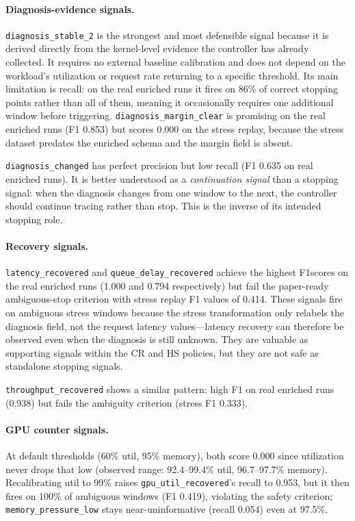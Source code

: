 \paragraph{Diagnosis-evidence signals.}
\texttt{diagnosis\_stable\_2} is the strongest and most defensible signal because it is derived directly from the kernel-level evidence the controller has already collected. It requires no external baseline calibration and does not depend on the workload's utilization or request rate returning to a specific threshold. Its main limitation is recall: on the real enriched runs it fires on 86\% of correct stopping points rather than all of them, meaning it occasionally requires one additional window before triggering.
\texttt{diagnosis\_margin\_clear} is promising on the real enriched runs (F1 0.853) but scores 0.000 on the stress replay, because the stress dataset predates the enriched schema and the margin field is absent.

\texttt{diagnosis\_changed} has perfect precision but low recall (F1 0.635 on real enriched runs). It is better understood as a \emph{continuation signal} than a stopping signal: when the diagnosis changes from one window to the next, the controller should continue tracing rather than stop. This is the inverse of its intended stopping role.

\paragraph{Recovery signals.}
\texttt{latency\_recovered} and \texttt{queue\_delay\_recovered} achieve the highest F1scores on the real enriched runs (1.000 and 0.794 respectively) but fail the paper-ready ambiguous-stop criterion with stress replay F1 values of 0.414. These signals fire on ambiguous stress windows because the stress transformation only relabels the diagnosis field, not the request latency values---latency recovery can therefore be observed even when the diagnosis is still unknown. They are valuable as supporting signals within the \textsc{CR} and \textsc{HS} policies, but they are not safe as standalone stopping signals.

\texttt{throughput\_recovered} shows a similar pattern: high F1 on real enriched runs (0.938) but fails the ambiguity criterion (stress F1 0.333).

\paragraph{GPU counter signals.}
At default thresholds (60\% util, 95\% memory), both score 0.000 since utilization never drops that low (observed range: 92.4--99.4\% util, 96.7--97.7\% memory). Recalibrating util to 99\% raises \texttt{gpu\_util\_recovered}'s recall to 0.953, but it then fires on 100\% of ambiguous windows (F1 0.419), violating the safety criterion; \texttt{memory\_pressure\_low} stays near-uninformative (recall 0.054) even at 97.5\%.

